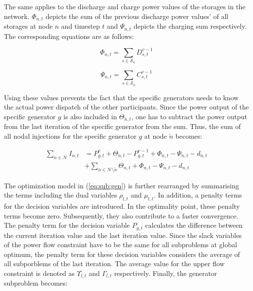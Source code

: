  The same applies to the discharge and charge power values of the storages in the network. $\Phi_{n,t}$ depicts the sum of the previous discharge power values' of all storages at node $n$ and timestep $t$ and $\Psi_{n,t}$ depicts the charging sum respectively. The corresponding equations are as follows:
 
\begin{equation}
	\Phi_{n,t} = \sum_{s\in\mathcal{S}_n}D_{s,t}^{v-1}
\end{equation}

\begin{equation}
	\Psi_{n,t} = \sum_{s\in\mathcal{S}_n}C_{s,t}^{v-1}
\end{equation}
 
 Using these values prevents the fact that the specific generators needs to know the actual power dispatch of the other participants. Since the power output of the specific generator $g$ is also included in $\Theta_{\breve{n},t}$, one has to subtract the power output from the last iteration of the specific generator from the sum. Thus, the sum of all nodal injections for the specific generator $g$ at node $\breve{n}$ becomes: 

 \begin{align}
 	\sum_{n \in \mathcal{N}} I_{n,t} &= P_{g,t}^v + \Theta_{\breve{n},t} - P_{g,t}^{v-1} + \Phi_{\breve{n},t} - \Psi_{\breve{n},t} - d_{\breve{n},t} \\
 	& + \sum_{n \in \mathcal{N} \setminus \breve{n}} \Theta_{n,t} + \Phi_{n,t} - \Psi_{n,t} - d_{n,t} \nonumber
 \end{align}
 
 The optimization model in (\ref{eq:sub:gen}) is further rearranged by summarising the terms including the dual variables $\rho_{l,t}$ and $\mu_{l,t}$. In addition, a penalty terms for the decision variables are introduced. In the optimality point, these penalty terms become zero. Subsequently, they also contribute to a faster convergence. The penalty term for the decision variable $P_{g,t}$ calculates the difference between the current iteration value and the last iteration value. Since the slack variables of the power flow constraint have to be the same for all subproblems at global optimum, the penalty term for these decision variables considers the average of all subporblems of the last iteration. The average value for the upper flow constraint is denoted as $\Upsilon_{l,t}$ and $\Gamma_{l,t}$ respectively. Finally, the generator subproblem becomes:
 
